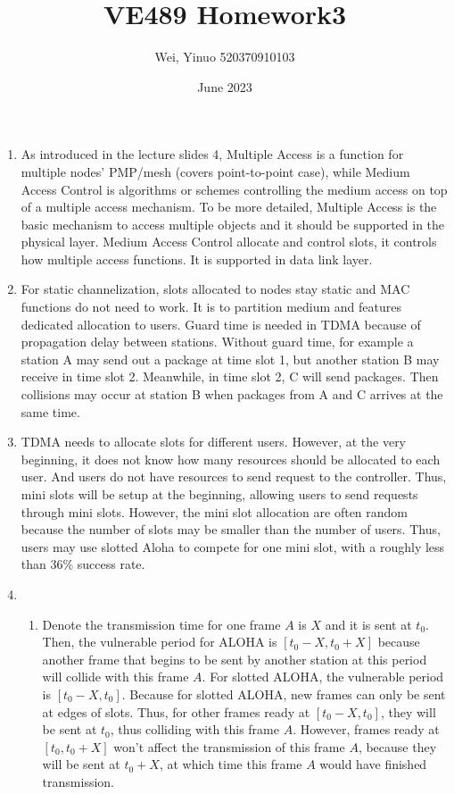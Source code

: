 \documentclass{article}
\title{VE489 Homework3}
\author{Wei, Yinuo 520370910103}
\date{June 2023}
\begin{document}
\maketitle

\begin{enumerate}
    \item 
    As introduced in the lecture slides 4, Multiple Access is a function for multiple nodes’ PMP/mesh (covers point-to-point case), while Medium Access Control is algorithms or schemes controlling the medium access on top of a multiple access mechanism. 
    \newline To be more detailed, Multiple Access is the basic mechanism to access multiple objects and it should be supported in the physical layer. Medium Access Control allocate and control slots, it controls how multiple access functions. It is supported in data link layer.
    
    \item
    For static channelization, slots allocated to nodes stay static and MAC functions do not need to work. It is to partition medium and features dedicated allocation to users.
    \newline
    Guard time is needed in TDMA because of propagation delay between stations. Without guard time, for example a station A may send out a package at time slot 1, but another station B may receive in time slot 2. Meanwhile, in time slot 2, C will send packages. Then collisions may occur at station B when packages from A and C arrives at the same time.
    
    \item
    TDMA needs to allocate slots for different users. However, at the very beginning, it does not know how many resources should be allocated to each user. And users do not have resources to send request to the controller. Thus, mini slots will be setup at the beginning, allowing users to send requests through mini slots. However, the mini slot allocation are often random because the number of slots may be smaller than the number of users. Thus, users may use slotted Aloha to compete for one mini slot, with a roughly less than 36\% success rate.
    
    \item
    \begin{enumerate}
        \item 
        Denote the transmission time for one frame $A$ is $X$ and it is sent at $t_0$. Then, the vulnerable period for ALOHA is $[t_0-X, t_0+X]$ because another frame that begins to be sent by another station at this period will collide with this frame $A$.
        \newline For slotted ALOHA, the vulnerable period is $[t_0-X, t_0]$. Because for slotted ALOHA, new frames can only be sent at edges of slots. Thus, for other frames ready at $[t_0-X, t_0]$, they will be sent at $t_0$, thus colliding with this frame $A$. However, frames ready at $[t_0, t_0+X]$ won't affect the transmission of this frame $A$, because they will be sent at $t_0+X$, at which time this frame $A$ would have finished transmission.
        

\end{enumerate}
\end{enumerate}
\end{document}
